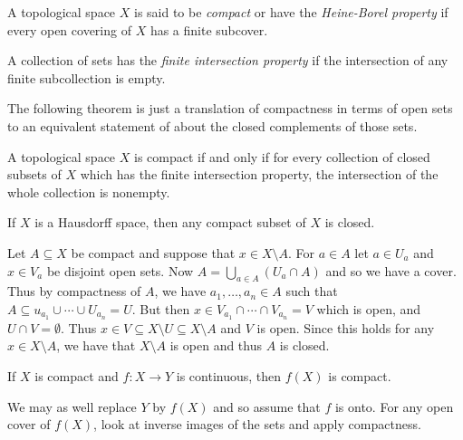 \documentclass[letterpaper, 11pt]{article}
\begin{document}
\begin{defn}
  A topological space $X$ is said to be \emph{compact} or have the \emph{Heine-Borel property} if every open covering of $X$ has a finite subcover.
\end{defn}

\begin{defn}
  A collection of sets has the \emph{finite intersection property} if the intersection of any finite subcollection is empty.
\end{defn}

The following theorem is just a translation of compactness in terms of open sets to an equivalent statement of about the closed complements of those sets.

\begin{thrm}\label{thrm: compact_iff_nonempty_intersection}
  A topological space $X$ is compact if and only if for every collection of closed subsets of $X$ which has the finite intersection property, the intersection of the whole collection is nonempty.
\end{thrm}
\begin{pf}
\end{pf}

\begin{thrm}\label{thrm: compact_subset_Hausdorff_closed}
  If $X$ is a Hausdorff space, then any compact subset of $X$ is closed.
\end{thrm}
\begin{pf}
  Let $A \subseteq X$ be compact and suppose that $x \in X \setminus A$.
  For $a \in A$ let $a \in U_{a}$ and $x \in V_{a}$ be disjoint open sets.
  Now $A = \bigcup_{a \in A} (U_{a} \cap A)$ and so we have a cover.
  Thus by compactness of $A$, we have $a_{1}, \ldots, a_{n} \in A$ such that $A \subseteq u_{a_{1}} \cup \cdots \cup U_{a_{n}} = U$.
  But then $x \in V_{a_{1}} \cap \cdots \cap V_{a_{n}} = V$ which is open, and $U \cap V = \emptyset$.
  Thus $x \in V \subseteq X \setminus U \subseteq X \setminus A$ and $V$ is open.
  Since this holds for any $x \in X \setminus A$, we have that $X \setminus A$ is open and thus $A$ is closed.
\end{pf}

\begin{thrm}
  If $X$ is compact and $f\colon X \to Y$ is continuous, then $f(X)$ is compact.
\end{thrm}
\begin{thrm}
  We may as well replace $Y$ by $f(X)$ and so assume that $f$ is onto.
  For any open cover of $f(X)$, look at inverse images of the sets and apply compactness.
\end{thrm}
\end{document}
